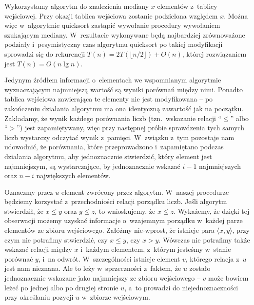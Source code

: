 \exercise %

\noindent Wykorzystamy algorytm  do znalezienia mediany $x$ elementów z~tablicy wejściowej. Przy okazji tablica wejściowa zostanie podzielona względem $x$. Można więc w~algorytmie quicksort zastąpić wywołanie procedury  wywołaniem  szukającym mediany. W~rezultacie wykonywane będą najbardziej zrównoważone podziały i~pesymistyczny czas algorytmu quicksort po takiej modyfikacji sprowadzi się do rekurencji $T(n)=2T(\lfloor n/2\rfloor)+O(n)$, której rozwiązaniem jest $T(n)=O(n\lg n)$.

\exercise %
Jedynym źródłem informacji o~elementach we wspomnianym algorytmie wyznaczającym  najmniejszą wartość są wyniki porównań między nimi. Ponadto tablica wejściowa zawierająca te elementy nie jest modyfikowana -- po zakończeniu działania algorytmu ma ona identyczną zawartość jak na początku. Zakładamy, że wynik każdego porównania liczb (tzn.\ wskazanie relacji ``$\le$'' albo ``$>$'') jest zapamiętywany, więc przy następnej próbie sprawdzenia tych samych liczb wystarczy odczytać wynik z~pamięci. W~związku z~tym pozostaje nam udowodnić, że porównania, które przeprowadzono i~zapamiętano podczas działania algorytmu, aby jednoznacznie stwierdzić, który element jest  najmniejszym, są wystarczające, by jednoznacznie wskazać $i-1$ najmniejszych oraz $n-i$ największych elementów.

Oznaczmy przez $u$ element zwrócony przez algorytm. W~naszej procedurze będziemy korzystać z~przechodniości relacji porządku liczb. Jeśli algorytm stwierdził, że $x\le y$ oraz $y\le z$, to wnioskujemy, że $x\le z$. Wykażemy, że dzięki tej obserwacji możemy uzyskać informacje o~wzajemnym porządku w~każdej parze elementów ze zbioru wejściowego. Załóżmy nie-wprost, że istnieje para $\langle x,y\rangle$, przy czym nie potrafimy stwierdzić, czy $x\le y$, czy $x>y$. Wówczas nie potrafimy także wskazać relacji między $x$ i~każdym elementem, z~którym jesteśmy w~stanie porównać $y$, i~na odwrót. W~szczególności istnieje element $v$, którego relacja z~$u$ jest nam nieznana. Ale to leży w~sprzeczności z~faktem, że $u$ zostało jednoznacznie wskazane jako  najmniejszy ze zbioru wejściowego -- $v$ może bowiem leżeć po jednej albo po drugiej stronie $u$, a~to prowadzi do niejednoznaczności przy określaniu pozycji $u$ w~zbiorze wejściowym.

